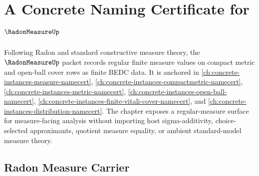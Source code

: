 \chapter{A Concrete Naming Certificate for $\RadonMeasureUp$}
\label{ch:concrete-instances-radon-measure-namecert}

Following Radon and standard constructive measure theory, the $\RadonMeasureUp$ packet records regular finite measure values on compact metric and open-ball cover rows as finite BEDC data. It is anchored in \autoref{ch:concrete-instances-measure-namecert}, \autoref{ch:concrete-instances-compactmetric-namecert}, \autoref{ch:concrete-instances-metric-namecert}, \autoref{ch:concrete-instances-open-ball-namecert}, \autoref{ch:concrete-instances-finite-vitali-cover-namecert}, and \autoref{ch:concrete-instances-distribution-namecert}. The chapter exposes a regular-measure surface for measure-facing analysis without importing host sigma-additivity, choice-selected approximants, quotient measure equality, or ambient standard-model measure theory.

\section{Radon Measure Carrier}
\label{sec:radon-measure-carrier}

